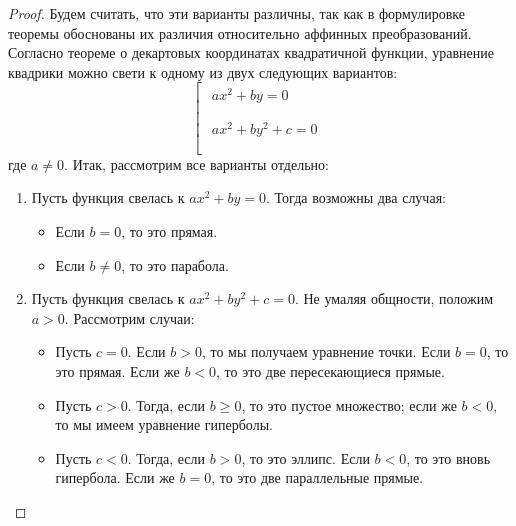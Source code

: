 \documentclass[11pt]{article}
\begin{document}
    \begin{proof}
    Будем считать, что эти варианты различны, так как в формулировке теоремы обоснованы их различия относительно аффинных преобразований. Согласно теореме о декартовых координатах квадратичной функции, уравнение квадрики можно свети к одному из двух следующих вариантов:
    \begin{equation*}
            \left[
      \begin{gathered}
          \begin{gathered}
            ax^2 + by = 0
            \\
          \end{gathered}
        \\
          \begin{gathered}
            ax^2 + by^2 + c = 0
            \\
          \end{gathered}
        \\
      \end{gathered}
    \right.
    \end{equation*}
    где $a \neq 0$. Итак, рассмотрим все варианты отдельно:
    \begin{enumerate}
        \item Пусть функция свелась к $ax^2 + by = 0$. Тогда возможны два случая:
        \begin{itemize}
            \item Если $b = 0$, то это прямая.
            \item Если $b \neq 0$, то это парабола.
        \end{itemize}
        \item Пусть функция свелась к $ax^2 + by^2 + c = 0$. Не умаляя общности, положим $a > 0$. Рассмотрим случаи:
    \begin{itemize}
        \item Пусть $c = 0$. Если $b > 0$, то мы получаем уравнение точки. Если $b = 0$, то это прямая. Если же $b < 0$, то это две пересекающиеся прямые.
        \item Пусть $c > 0$. Тогда, если $b \geq 0$, то это пустое множество; если же $b < 0$, то мы имеем уравнение гиперболы.
        \item Пусть $c < 0$. Тогда, если $b > 0$, то это эллипс. Если $b < 0$, то это вновь гипербола. Если же $b = 0$, то это две параллельные прямые.
    \end{itemize}
    \end{enumerate}
    \end{proof}
    
\end{document}
